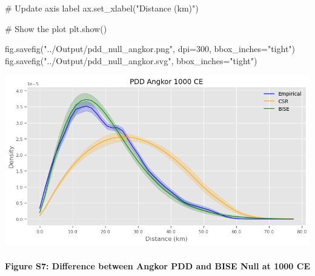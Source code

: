 \documentclass[
  11pt,
  letterpaper,
  DIV=11,
  numbers=noendperiod]{scrartcl}
\let\oldparagraph\paragraph
\renewcommand{\paragraph}[1]{\oldparagraph{#1}\mbox{}}
\newenvironment{Shaded}{\begin{snugshade}}{\end{snugshade}}
\newcommand{\CommentTok}[1]{\textcolor[rgb]{0.37,0.37,0.37}{#1}}
\newcommand{\DecValTok}[1]{\textcolor[rgb]{0.68,0.00,0.00}{#1}}
\newcommand{\NormalTok}[1]{\textcolor[rgb]{0.00,0.23,0.31}{#1}}
\newcommand{\OperatorTok}[1]{\textcolor[rgb]{0.37,0.37,0.37}{#1}}
\newcommand{\StringTok}[1]{\textcolor[rgb]{0.13,0.47,0.30}{#1}}
\begin{document}
\begin{Shaded}
\begin{Highlighting}[]
\CommentTok{\# Update axis label}
\NormalTok{ax.set\_xlabel(}\StringTok{"Distance (km)"}\NormalTok{)}

\CommentTok{\# Show the plot}
\NormalTok{plt.show()}

\NormalTok{fig.savefig(}\StringTok{"../Output/pdd\_null\_angkor.png"}\NormalTok{, dpi}\OperatorTok{=}\DecValTok{300}\NormalTok{, bbox\_inches}\OperatorTok{=}\StringTok{"tight"}\NormalTok{)}
\NormalTok{fig.savefig(}\StringTok{"../Output/pdd\_null\_angkor.svg"}\NormalTok{, bbox\_inches}\OperatorTok{=}\StringTok{"tight"}\NormalTok{)}
\end{Highlighting}
\end{Shaded}

\includegraphics{analysis_files/figure-pdf/cell-15-output-1.png}

\paragraph{Figure S7: Difference between Angkor PDD and BISE Null at
1000
CE}\label{figure-s7-difference-between-angkor-pdd-and-bise-null-at-1000-ce}
\end{document}

